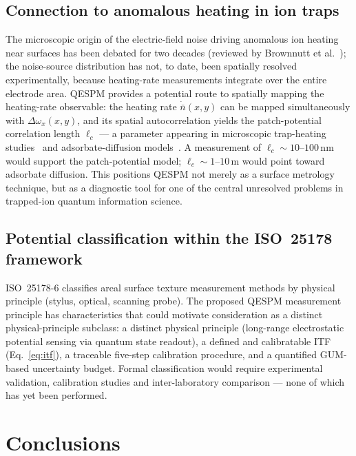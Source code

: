 \documentclass[12pt,a4paper]{article}
\begin{document}
\subsection{Connection to anomalous heating in ion traps}

The microscopic origin of the electric-field noise driving anomalous ion
heating near surfaces has been debated for two decades (reviewed by
Brownnutt et al.~\cite{brownnutt2015review}); the noise-source
distribution has not, to date, been spatially resolved experimentally,
because heating-rate measurements integrate over the entire electrode
area.  QESPM provides a potential route to spatially mapping the
heating-rate observable: the heating rate
$\dot{\bar n}(x,y)$ can be mapped simultaneously with
$\Delta\omega_x(x,y)$, and its spatial autocorrelation yields the
patch-potential correlation length $\ell_c$ --- a parameter appearing in
microscopic trap-heating studies~\cite{daniilidis2011fabrication} and
adsorbate-diffusion models~\cite{kim2017noise}.  A measurement of
$\ell_c\sim10$--$100$\,nm would support the patch-potential model;
$\ell_c\sim1$--$10$\,\textmu m would point toward adsorbate diffusion.
This positions QESPM not merely as a surface metrology technique, but as
a diagnostic tool for one of the central unresolved problems in
trapped-ion quantum information science.

\subsection{Potential classification within the ISO~25178 framework}

ISO~25178-6 classifies areal surface texture measurement methods by
physical principle (stylus, optical, scanning probe).  The proposed
QESPM measurement principle has characteristics that could motivate
consideration as a distinct physical-principle subclass: a distinct
physical principle (long-range electrostatic potential sensing via
quantum state readout), a defined and calibratable ITF
(Eq.~\ref{eq:itf}), a traceable five-step calibration procedure, and a
quantified GUM-based uncertainty budget.  Formal classification would
require experimental validation, calibration studies and
inter-laboratory comparison --- none of which has yet been performed.

\section{Conclusions}
\label{sec:conclusions}
\end{document}
